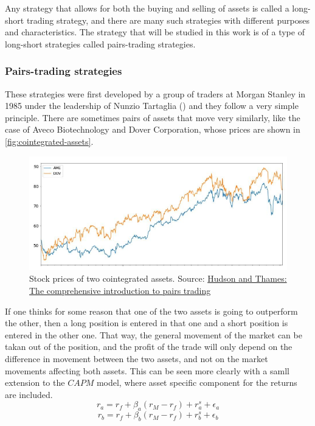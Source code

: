 Any strategy that allows for both the buying and selling of assets is called a long-short trading strategy, and there are many such strategies with different purposes and characteristics. The strategy that will be studied in this work is of a type of long-short strategies called pairs-trading strategies.

\subsubsection{Pairs-trading strategies}
These strategies were first developed by a group of traders at Morgan Stanley in 1985 under the leadership of Nunzio Tartaglia (\cite{pole_2011}) and they follow a very simple principle. There are sometimes pairs of assets that move very similarly, like the case of Aveco Biotechnology and Dover Corporation, whose prices are shown in \autoref{fig:cointegrated-assets}.

\begin{figure}[h]
    \captionsetup{justification=centering}
    \includegraphics[width=\linewidth]{assets/cointegrated-assets.png}
    \caption{Stock prices of two cointegrated assets. Source: \href{https://hudsonthames.org/definitive-guide-to-pairs-trading/}{Hudson and Thames: The comprehensive introduction to pairs trading}}
    \label{fig:cointegrated-assets}
\end{figure}

If one thinks for some reason that one of the two assets is going to outperform the other, then a long position is entered in that one and a short position is entered in the other one. That way, the general movement of the market can be takan out of the position, and the profit of the trade will only depend on the difference in movement between the two assets, and not on the market movements affecting both assets. 
This can be seen more clearly with a samll extension to the $CAPM$ model, where asset specific component for the returns are included.
\begin{equation}
    r_a=r_f+\beta_a(r_M-r_f)+ r_a^s+ \epsilon_a
\end{equation}
\begin{equation}
    r_b=r_f+\beta_b(r_M-r_f)+ r_b^s+ \epsilon_b
\end{equation}

